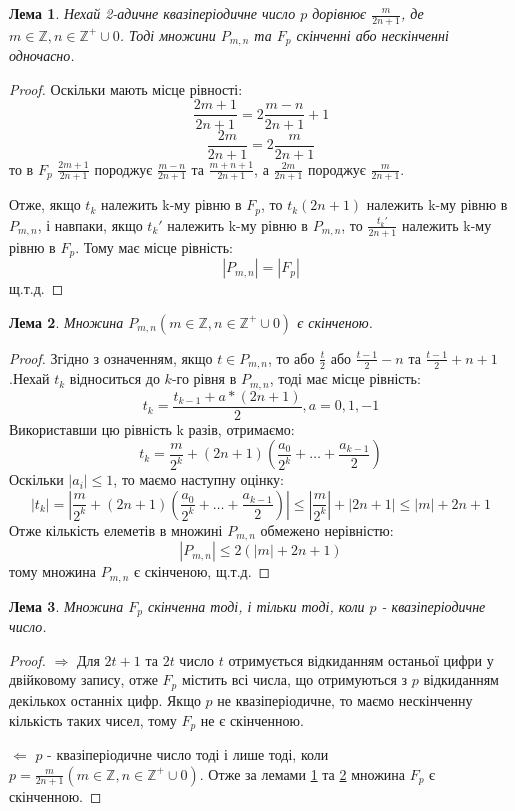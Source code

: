 \documentclass[a4paper,12pt]{article} \usepackage{a4wide}
\numberwithin{equation}{subsection}
\newtheorem{lemma}{Лема}[subsection]
\begin{document}
 \begin{lemma}\label{F_P_equal}
   Нехай 2-адичне квазіперіодичне число $p$ дорівнює $\frac{m}{2n+1}$,
   де $ m\in \mathbb{Z}, n\in \mathbb{Z}^+\cup 0$. Тоді множини
   $P_{m,n}$ та $F_p $ скінченні або нескінченні одночасно.
 \end{lemma}
 \begin{proof}
   Оскільки мають місце рівності:
   $$\frac{2m+1}{2n+1}=2\frac{m-n}{2n+1}+1$$
   $$\frac{2m}{2n+1}=2\frac{m}{2n+1}$$
   то в $F_p$ $\frac{2m+1}{2n+1}$ породжує $\frac{m-n}{2n+1}$ та
   $\frac{m+n+1}{2n+1}$, а $\frac{2m}{2n+1}$ породжує
   $\frac{m}{2n+1}$.

   Отже, якщо $t_k$ належить k-му рівню в $F_p$, то $t_k(2n+1)$
   належить k-му рівню в $P_{m,n}$, і навпаки, якщо $t_k'$ належить
   k-му рівню в $P_{m,n}$, то $\frac{t_k'}{2n+1}$ належить k-му рівню
   в $F_p$. Тому має місце рівність:
$$|P_{m,n}| = |F_p|$$
щ.т.д.
\end{proof}

 \begin{lemma}\label{P_finite}
   Множина $P_{m,n} ( m\in \mathbb{Z}, n\in \mathbb{Z}^+\cup 0 )$ є
   скінченою.
 \end{lemma}
 \begin{proof}
   Згідно з означенням, якщо $t\in P_{m,n}$, то або $\frac{t}{2}$ або
   $\frac{t-1}{2}-n$ та $\frac{t-1}{2}+n+1$.Нехай $t_k$ відноситься до
   $k$-го рівня в $P_{m,n}$, тоді має місце рівність:
$$t_k = \frac{t_{k-1}+a*(2n+1)}{2}, a=0,1,-1$$
Використавши цю рівність k разів, отримаємо:
$$t_k = \frac{m}{2^k}+(2n+1)(\frac{a_0}{2^k}+\dots+\frac{a_{k-1}}{2})$$
Оскільки $|a_i|\leq 1$, то маємо наступну оцінку:
$$|t_k| = \left| \frac{m}{2^k}+(2n+1)(\frac{a_0}{2^k}+\dots+\frac{a_{k-1}}{2})\right|\leq \left| \frac{m}{2^k}\right|+|2n+1|\leq |m|+2n+1$$
Отже кількість елеметів в множині $P_{m,n}$ обмежено нерівністю:
$$\left|P_{m,n}\right|\leq 2(|m|+2n+1)$$
тому множина $P_{m,n}$ є скінченою, щ.т.д.
\end{proof}

\begin{lemma}\label{F_finite}
  Множина $F_p$ скінченна тоді, і тільки тоді, коли $p$ -
  квазіперіодичне число.
\end{lemma}
\begin{proof}

  $\Rightarrow$ Для $2t+1$ та $2t$ число $t$ отримується відкиданням
  останьої цифри у двійковому запису, отже $F_p$ містить всі числа, що
  отримуються з $p$ відкиданням декількох останніх цифр. Якщо $p$ не
  квазіперіодичне, то маємо нескінченну кількість таких чисел, тому
  $F_p$ не є скінченною.

  $\Leftarrow$ $p$ - квазіперіодичне число тоді і лише тоді, коли
  $p=\frac{m}{2n+1} (m\in\mathbb{Z}, n\in \mathbb{Z}^+\cup 0)$.  Отже
  за лемами \ref{F_P_equal} та \ref{P_finite} множина $F_p$ є
  скінченною.
\end{proof}
\end{document}
